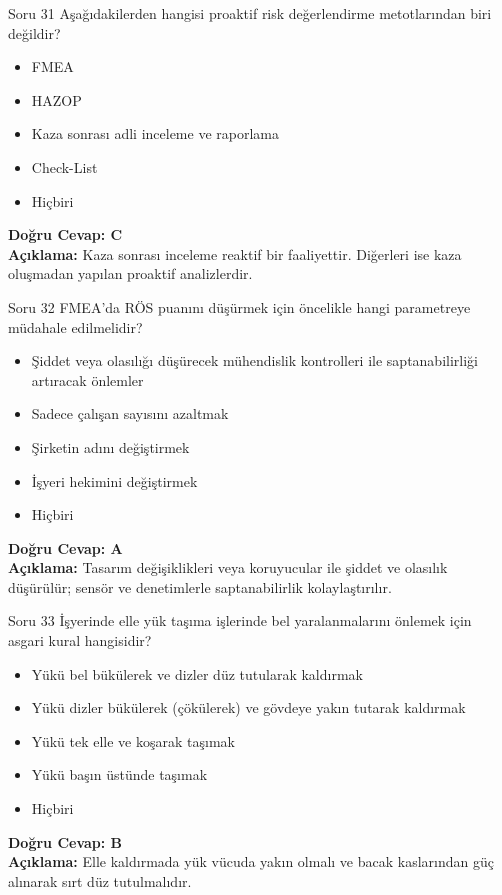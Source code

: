 \documentclass[12pt,a4paper]{article}
\begin{document}
\begin{testcard}{Soru 31}
    Aşağıdakilerden hangisi proaktif risk değerlendirme metotlarından biri değildir?
    \begin{itemize}
        \item[A)] FMEA
        \item[B)] HAZOP
        \item[C)] Kaza sonrası adli inceleme ve raporlama
        \item[D)] Check-List
        \item[E)] Hiçbiri
    \end{itemize}
    \tcblower
    \textbf{Doğru Cevap: C} \\
    \textbf{Açıklama:} Kaza sonrası inceleme reaktif bir faaliyettir. Diğerleri ise kaza oluşmadan yapılan proaktif analizlerdir.
\end{testcard}

\begin{testcard}{Soru 32}
    FMEA'da RÖS puanını düşürmek için öncelikle hangi parametreye müdahale edilmelidir?
    \begin{itemize}
        \item[A)] Şiddet veya olasılığı düşürecek mühendislik kontrolleri ile saptanabilirliği artıracak önlemler
        \item[B)] Sadece çalışan sayısını azaltmak
        \item[C)] Şirketin adını değiştirmek
        \item[D)] İşyeri hekimini değiştirmek
        \item[E)] Hiçbiri
    \end{itemize}
    \tcblower
    \textbf{Doğru Cevap: A} \\
    \textbf{Açıklama:} Tasarım değişiklikleri veya koruyucular ile şiddet ve olasılık düşürülür; sensör ve denetimlerle saptanabilirlik kolaylaştırılır.
\end{testcard}

\begin{testcard}{Soru 33}
    İşyerinde elle yük taşıma işlerinde bel yaralanmalarını önlemek için asgari kural hangisidir?
    \begin{itemize}
        \item[A)] Yükü bel bükülerek ve dizler düz tutularak kaldırmak
        \item[B)] Yükü dizler bükülerek (çökülerek) ve gövdeye yakın tutarak kaldırmak
        \item[C)] Yükü tek elle ve koşarak taşımak
        \item[D)] Yükü başın üstünde taşımak
        \item[E)] Hiçbiri
    \end{itemize}
    \tcblower
    \textbf{Doğru Cevap: B} \\
    \textbf{Açıklama:} Elle kaldırmada yük vücuda yakın olmalı ve bacak kaslarından güç alınarak sırt düz tutulmalıdır.
\end{testcard}
\end{document}

